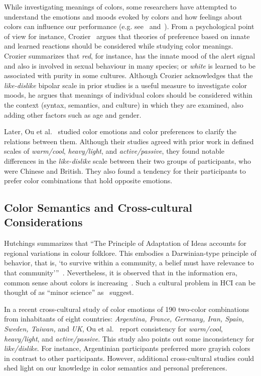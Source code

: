 \documentclass[prodmode,acmtochi]{acmsmall}
\begin{document}
While investigating meanings of colors, some researchers have attempted to understand the emotions and moods evoked by colors and how feelings about colors can influence our performance (e.g. see~\cite{thuring2007usability} and~\cite{linSemantically2013}). From a psychological point of view for instance, Crozier~\cite{crozier1996psychology} argues that theories of preference based on innate and learned reactions should be considered while studying color meanings. Crozier summarizes that \emph{red}, for instance, has the innate mood of the alert signal and also is involved in sexual behaviour in many species; or \emph{white} is learned to be associated with purity in some cultures. Although Crozier acknowledges that the \emph{like-dislike} bipolar scale in prior studies is a useful measure to investigate color moods, he argues that meanings of individual colors should be considered within the context (syntax, semantics, and culture) in which they are examined, also adding other factors such as age and gender.

Later, Ou et al.~\cite{ou2004studyI,ou2004studyII,ou2004studyIII} studied color emotions and color preferences to clarify the relations between them. Although their studies agreed with prior work in defined scales of \emph{warm/cool}, \emph{heavy/light}, and \emph{active/passive}, they found notable differences in the \emph{like-dislike} scale between their two groups of participants, who were Chinese and British. They also found a tendency for their participants to prefer color combinations that hold opposite emotions.


\subsection{Color Semantics and Cross-cultural Considerations}

Hutchings summarizes that ``The Principle of Adaptation of Ideas accounts for regional variations in colour folklore. This embodies a Darwinian-type principle of behavior, that is, `to survive within a community, a belief must have relevance to that community'''~\cite{hutchings2004colour}. Nevertheless, it is observed that in the information era, common sense about colors is increasing~\cite{carroll2007art}.
Such a cultural problem in HCI can be thought of as ``minor science'' as~\cite{ghassan2013legitimacy} suggest.

In a recent cross-cultural study of color emotions of 190 two-color combinations from inhabitants of eight countries: \emph{Argentina, France, Germany, Iran, Spain, Sweden, Taiwan,} and \emph{UK}, Ou et al.~\cite{ou2012cross} report consistency for \emph{warm/cool}, \emph{heavy/light}, and \emph{active/passive}. This study also points out some inconsistency for \emph{like/dislike}. For instance, Argentinian participants preferred more grayish colors in contrast to other participants. However, additional cross-cultural studies could shed light on our knowledge in color semantics and personal preferences.
\end{document}
